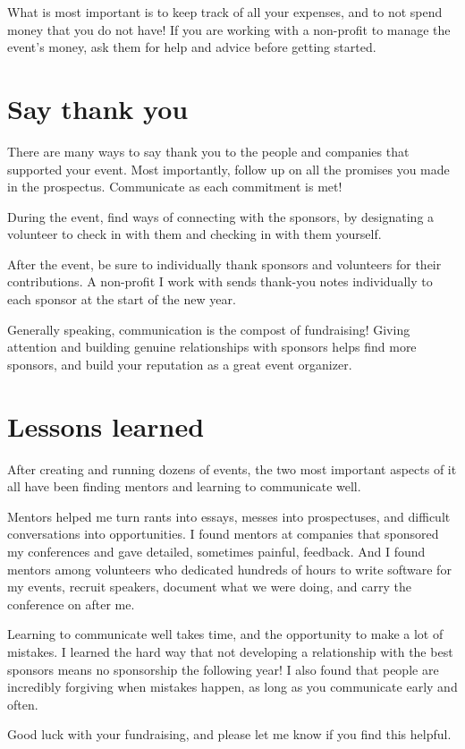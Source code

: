 What is most important is to keep track of all your expenses, and to not spend
money that you do not have! If you are working with a non-profit to manage the
event’s money, ask them for help and advice before getting started.

\section*{Say thank you}
There are many ways to say thank you to the people and companies that supported
your event. Most importantly, follow up on all the promises you made in the
prospectus. Communicate as each commitment is met!

During the event, find ways of connecting with the sponsors, by designating a
volunteer to check in with them and checking in with them yourself.

After the event, be sure to individually thank sponsors and volunteers for their
contributions. A non-profit I work with sends thank-you notes individually to
each sponsor at the start of the new year.

Generally speaking, communication is the compost of fundraising! Giving
attention and building genuine relationships with sponsors helps find more
sponsors, and build your reputation as a great event organizer.

\section*{Lessons learned}
After creating and running dozens of events, the two most important aspects of
it all have been finding mentors and learning to communicate well. 

Mentors helped me turn rants into essays, messes into prospectuses, and
difficult conversations into opportunities. I found mentors at companies that
sponsored my conferences and gave detailed, sometimes painful, feedback. And I
found mentors among volunteers who dedicated hundreds of hours to write software
for my events, recruit speakers, document what we were doing, and carry the
conference on after me. 

Learning to communicate well takes time, and the opportunity to make a lot of
mistakes. I learned the hard way that not developing a relationship with the
best sponsors means no sponsorship the following year! I also found that people
are incredibly forgiving when mistakes happen, as long as you communicate early
and often.

Good luck with your fundraising, and please let me know if you find this
helpful.
